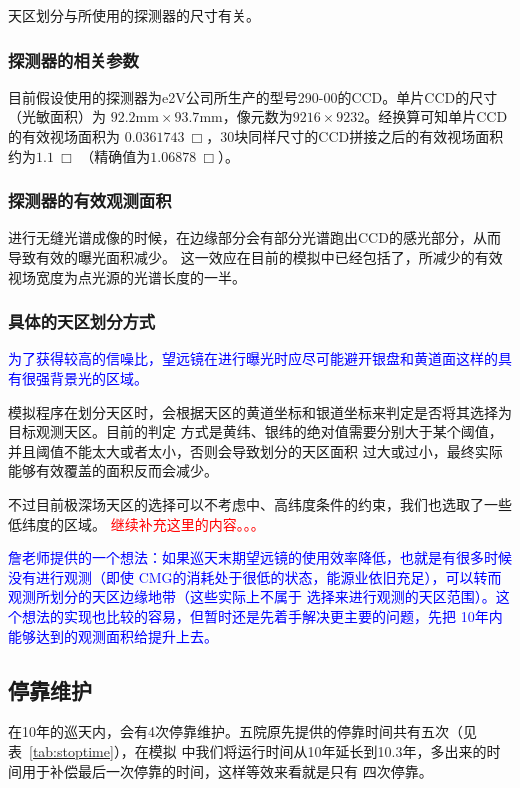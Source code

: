 \documentclass[a4paper,11pt]{ctexart}
\newcommand{\RT}[1]{\textcolor{red}{#1}}
\newcommand{\BT}[1]{\textcolor{blue}{#1}}
\begin{document}
天区划分与所使用的探测器的尺寸有关。

\subsubsection{探测器的相关参数}
目前假设使用的探测器为e2V公司所生产的型号290-00的CCD。单片CCD的尺寸（光敏面积）为
$92.2\text{mm}\times93.7\text{mm}$，像元数为$9216\times 9232$。经换算可知单片CCD的有效视场面积为
$0.0361743~\Box$\textdegree，30块同样尺寸的CCD拼接之后的有效视场面积约为$1.1~\Box$\textdegree
（精确值为$1.06878~\Box$\textdegree）。

\subsubsection{探测器的有效观测面积}

进行无缝光谱成像的时候，在边缘部分会有部分光谱跑出CCD的感光部分，从而导致有效的曝光面积减少。
这一效应在目前的模拟中已经包括了，所减少的有效视场宽度为点光源的光谱长度的一半。

\subsubsection{具体的天区划分方式}

\BT{\heiti 为了获得较高的信噪比，望远镜在进行曝光时应尽可能避开银盘和黄道面这样的具有很强背景光的区域。}

模拟程序在划分天区时，会根据天区的黄道坐标和银道坐标来判定是否将其选择为目标观测天区。目前的判定
方式是黄纬、银纬的绝对值需要分别大于某个阈值，并且阈值不能太大或者太小，否则会导致划分的天区面积
过大或过小，最终实际能够有效覆盖的面积反而会减少。

不过目前极深场天区的选择可以不考虑中、高纬度条件的约束，我们也选取了一些低纬度的区域。
\RT{继续补充这里的内容。。。}

\BT{詹老师提供的一个想法：如果巡天末期望远镜的使用效率降低，也就是有很多时候没有进行观测（即使
CMG的消耗处于很低的状态，能源业依旧充足），可以转而观测所划分的天区边缘地带（这些实际上不属于
选择来进行观测的天区范围）。这个想法的实现也比较的容易，但暂时还是先着手解决更主要的问题，先把
10年内能够达到的观测面积给提升上去。}

\subsection{停靠维护}
在10年的巡天内，会有4次停靠维护。五院原先提供的停靠时间共有五次（见表~\ref{tab:stoptime}），在模拟
中我们将运行时间从10年延长到10.3年，多出来的时间用于补偿最后一次停靠的时间，这样等效来看就是只有
四次停靠。
\end{document}
